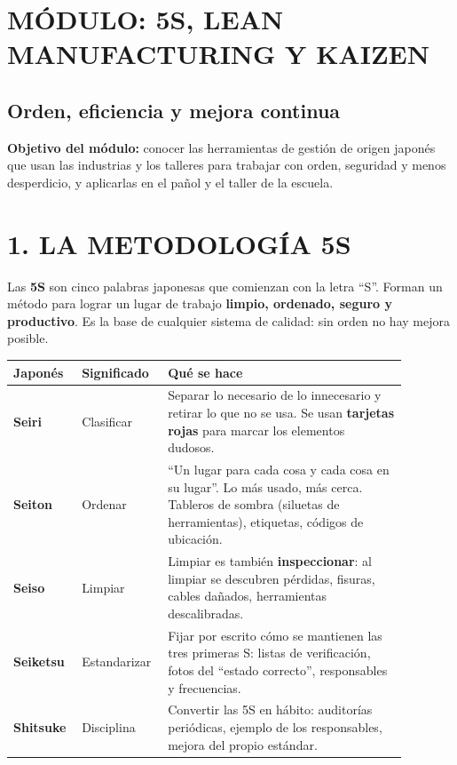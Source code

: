 \clearpage
\section*{MÓDULO: 5S, LEAN MANUFACTURING Y KAIZEN}
\subsection*{Orden, eficiencia y mejora continua}

\begin{recuadro}
\textbf{Objetivo del módulo:} conocer las herramientas de gestión de origen japonés que usan
las industrias y los talleres para trabajar con orden, seguridad y menos desperdicio, y
aplicarlas en el pañol y el taller de la escuela.
\end{recuadro}

\section*{1. LA METODOLOGÍA 5S}

Las \textbf{5S} son cinco palabras japonesas que comienzan con la letra ``S''. Forman un método
para lograr un lugar de trabajo \textbf{limpio, ordenado, seguro y productivo}. Es la base de
cualquier sistema de calidad: sin orden no hay mejora posible.

\begin{center}
\small
\begin{tabular}{|p{0.13\linewidth}|p{0.17\linewidth}|p{0.58\linewidth}|}
\hline
\textbf{Japonés} & \textbf{Significado} & \textbf{Qué se hace} \\ \hline
\textbf{Seiri} & Clasificar & Separar lo necesario de lo innecesario y retirar lo que no se
usa. Se usan \textbf{tarjetas rojas} para marcar los elementos dudosos. \\ \hline
\textbf{Seiton} & Ordenar & ``Un lugar para cada cosa y cada cosa en su lugar''. Lo más usado,
más cerca. Tableros de sombra (siluetas de herramientas), etiquetas, códigos de ubicación. \\ \hline
\textbf{Seiso} & Limpiar & Limpiar es también \textbf{inspeccionar}: al limpiar se descubren
pérdidas, fisuras, cables dañados, herramientas descalibradas. \\ \hline
\textbf{Seiketsu} & Estandarizar & Fijar por escrito cómo se mantienen las tres primeras S:
listas de verificación, fotos del ``estado correcto'', responsables y frecuencias. \\ \hline
\textbf{Shitsuke} & Disciplina & Convertir las 5S en hábito: auditorías periódicas, ejemplo de
los responsables, mejora del propio estándar. \\ \hline
\end{tabular}
\end{center}

